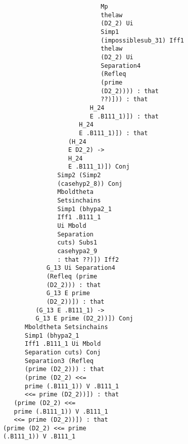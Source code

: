 \documentclass[12pt]{article}
\begin{document}
\begin{verbatim}
                                              Mp 
                                              thelaw 
                                              (D2_2) Ui 
                                              Simp1 
                                              (impossiblesub_31) Iff1 
                                              thelaw 
                                              (D2_2) Ui 
                                              Separation4 
                                              (Refleq 
                                              (prime 
                                              (D2_2)))) : that 
                                              ??)])) : that 
                                           H_24 
                                           E .B111_1)]) : that 
                                        H_24 
                                        E .B111_1)]) : that 
                                     (H_24 
                                     E D2_2) -> 
                                     H_24 
                                     E .B111_1)]) Conj 
                                  Simp2 (Simp2 
                                  (casehyp2_8)) Conj 
                                  Mboldtheta 
                                  Setsinchains 
                                  Simp1 (bhypa2_1 
                                  Iff1 .B111_1 
                                  Ui Mbold 
                                  Separation 
                                  cuts) Subs1 
                                  casehypa2_9 
                                  : that ??)]) Iff2 
                               G_13 Ui Separation4 
                               (Refleq (prime 
                               (D2_2))) : that 
                               G_13 E prime 
                               (D2_2))]) : that 
                            (G_13 E .B111_1) -> 
                            G_13 E prime (D2_2))]) Conj 
                         Mboldtheta Setsinchains 
                         Simp1 (bhypa2_1 
                         Iff1 .B111_1 Ui Mbold 
                         Separation cuts) Conj 
                         Separation3 (Refleq 
                         (prime (D2_2))) : that 
                         (prime (D2_2) <<= 
                         prime (.B111_1)) V .B111_1 
                         <<= prime (D2_2))]) : that 
                      (prime (D2_2) <<= 
                      prime (.B111_1)) V .B111_1 
                      <<= prime (D2_2))]) : that 
                   (prime (D2_2) <<= prime 
                   (.B111_1)) V .B111_1 

\end{verbatim}
\end{document}
